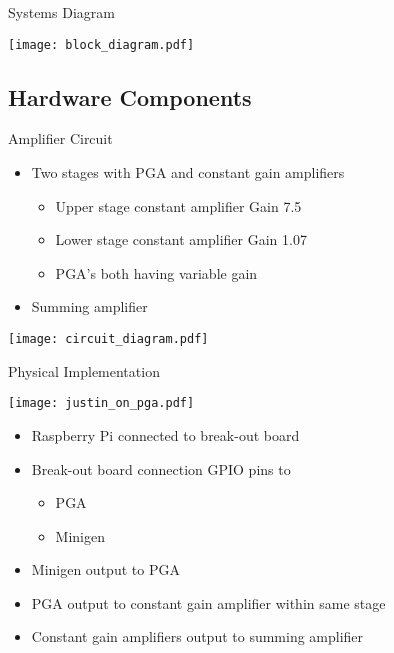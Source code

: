 \begin{frame}{Systems Diagram}
  \begin{center}
  \texttt{[image: block\_diagram.pdf]}
  \end{center}
\end{frame}

\subsection{Hardware Components}

\begin{frame}{Amplifier Circuit}
  \begin{itemize}
    \item Two stages with PGA and constant gain amplifiers
    \begin{itemize}
      \item Upper stage constant amplifier Gain 7.5 
      \item Lower stage constant amplifier Gain 1.07
      \item PGA's both having variable gain
    \end{itemize}
    \item Summing amplifier
  \end{itemize}

  \texttt{[image: circuit\_diagram.pdf]}
\end{frame}

\begin{frame}{Physical Implementation}
\begin{multicols}{2}
  \begin{center}
  \texttt{[image: justin\_on\_pga.pdf]}
  \end{center}

\newpage

    \begin{itemize}
      \item Raspberry Pi connected to break-out board
      \item Break-out board connection GPIO pins to
      \begin{itemize}
        \item PGA
        \item Minigen
      \end{itemize}
      \item Minigen output to PGA
      \item PGA output to constant gain amplifier within same stage
      \item Constant gain amplifiers output to summing amplifier
    \end{itemize}

\end{multicols}
\end{frame}

